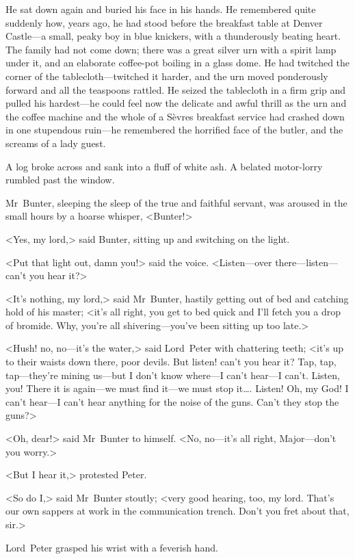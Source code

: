 He sat down again and buried his face in his hands. He remembered quite suddenly how, years ago, he had stood before the breakfast table at Denver Castle—a small, peaky boy in blue knickers, with a thunderously beating heart. The family had not come down; there was a great silver urn with a spirit lamp under it, and an elaborate coffee-pot boiling in a glass dome. He had twitched the corner of the tablecloth—twitched it harder, and the urn moved ponderously forward and all the teaspoons rattled. He seized the tablecloth in a firm grip and pulled his hardest—he could feel now the delicate and awful thrill as the urn and the coffee machine and the whole of a Sèvres breakfast service had crashed down in one stupendous ruin—he remembered the horrified face of the butler, and the screams of a lady guest.

A log broke across and sank into a fluff of white ash. A belated motor-lorry rumbled past the window.

Mr~Bunter, sleeping the sleep of the true and faithful servant, was aroused in the small hours by a hoarse whisper, <Bunter!>

<Yes, my lord,> said Bunter, sitting up and switching on the light.

<Put that light out, damn you!> said the voice. <Listen—over there—listen—can't you hear it?>

<It's nothing, my lord,> said Mr~Bunter, hastily getting out of bed and catching hold of his master; <it's all right, you get to bed quick and I'll fetch you a drop of bromide. Why, you're all shivering—you've been sitting up too late.>

<Hush! no, no—it's the water,> said Lord~Peter with chattering teeth; <it's up to their waists down there, poor devils. But listen! can't you hear it? Tap, tap, tap—they're mining us—but I don't know where—I can't hear—I can't. Listen, you! There it is again—we must find it—we must stop it\dots . Listen! Oh, my God! I can't hear—I can't hear anything for the noise of the guns. Can't they stop the guns?>

<Oh, dear!> said Mr~Bunter to himself. <No, no—it's all right, Major—don't you worry.>

<But I hear it,> protested Peter.

<So do I\@,> said Mr~Bunter stoutly; <very good hearing, too, my lord. That's our own sappers at work in the communication trench. Don't you fret about that, sir.>

Lord~Peter grasped his wrist with a feverish hand.

